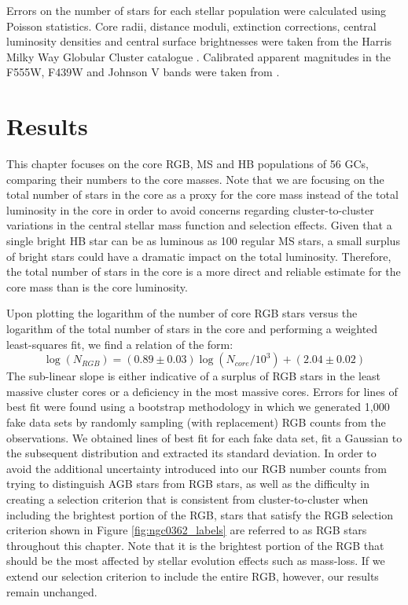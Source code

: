 Errors on the number of stars for each stellar population were
calculated using Poisson statistics.  Core radii,  
distance moduli, extinction corrections, central luminosity
densities and central surface brightnesses were taken from the Harris
Milky Way Globular Cluster catalogue \citep{harris96}.  Calibrated
apparent magnitudes in the F555W, F439W and Johnson V bands 
were taken from \citet{piotto02}.

\section{Results} \label{results3}

This chapter focuses on the core RGB, MS and HB populations of 56
GCs, comparing their numbers to the core masses.  Note that we
are focusing on the total number of stars in the core as a proxy for the
core mass instead of the total luminosity in the core in order to
avoid concerns regarding cluster-to-cluster variations in the central
stellar mass function and selection effects.  Given that a single
bright HB star can be as luminous as 100 regular MS stars, 
a small surplus of bright stars could have a dramatic impact on
the total luminosity.  
Therefore, the total number of stars in
the core is a more direct and reliable estimate for the core mass than
is the core luminosity.

Upon plotting the logarithm of the number of core RGB stars
versus the logarithm of the total number of stars in the core and
performing a weighted least-squares fit, we find a relation of
the form:
\begin{equation}
\label{eqn:power-laws}
\log (N_{RGB}) = (0.89 \pm 0.03)\log (N_{core}/10^3) + (2.04 \pm 0.02)
\end{equation}
The sub-linear slope is either indicative of a surplus of RGB stars in the
least massive cluster cores or a deficiency in the most massive cores.
Errors for lines of best fit were  
found using a bootstrap methodology in which we generated 1,000 fake
data sets by randomly sampling (with replacement) RGB counts from the
observations.  We obtained lines of best fit for each fake data set, fit a
Gaussian to the subsequent distribution and extracted its standard
deviation.  In order to avoid the additional uncertainty introduced
into our RGB number counts from trying to distinguish AGB stars from RGB
stars, as well as the difficulty in creating a selection criterion that
is consistent from cluster-to-cluster when including the brightest
portion of the RGB, stars that satisfy the RGB 
selection criterion shown in Figure \ref{fig:ngc0362_labels} are
referred to as RGB stars throughout this chapter.  Note that it is
the brightest portion of the RGB that should be the most affected by
stellar evolution effects such as mass-loss.  If we
extend our selection criterion to include the entire RGB, however, our
results remain unchanged.


